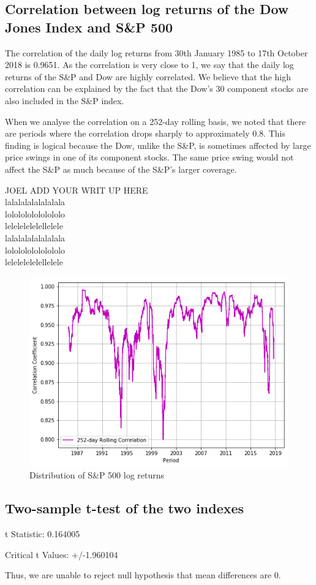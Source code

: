 \documentclass[a4paper]{article}
\begin{document}
\subsection{Correlation between log returns of the Dow Jones Index and S\&P 500}
The correlation of the daily log returns from 30th January 1985 to 17th October 2018 is 0.9651. As the correlation is very close to 1, we say that the daily log returns of the S\&P and Dow are highly correlated. We believe that the high correlation can be explained by the fact that the Dow’s 30 component stocks are also included in the S\&P index. 

When we analyse the correlation on a 252-day rolling basis, we noted that there are periods where the correlation drops sharply to approximately 0.8. This finding is logical because the Dow, unlike the S\&P, is sometimes affected by large price swings in one of its component stocks. The same price swing would not affect the S\&P as much because of the S\&P’s larger coverage. 

JOEL ADD YOUR WRIT UP HERE\\
lalalalalalalalala\\
lololololololololo\\
lelelelelelellelele\\
lalalalalalalalala\\
lololololololololo\\
lelelelelelellelele\\

\begin{figure}[h!]
	\centering
	\includegraphics[width=0.8\linewidth]{correlation.png}
	\caption{Distribution of S\&P 500 log returns}
\end{figure}

\newpage
\subsection{Two-sample t-test of the two indexes}
\begin{flushleft}
t Statistic: 0.164005

Critical t Values: +/-1.960104

Thus, we are unable to reject null hypothesis that mean differences are 0.
\end{flushleft}
\end{document}
